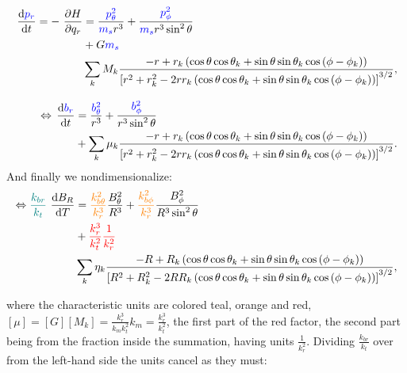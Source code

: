 \begin{align}
    \begin{split}
        \operatorname{}\frac{\mathrm{d} \textcolor{blue}{p_r}}{\mathrm{d} t} = -\operatorname{}\frac{\partial H}{\partial q_r} &= \frac{\textcolor{blue}{p_\theta^2}}{\textcolor{blue}{m_s} r^3} + \frac{\textcolor{blue}{p_\phi^2}}{\textcolor{blue}{m_s} r^3 \sin^2{\theta} } \\
        &+ G \textcolor{blue}{m_s} \\
        &\sum\limits_{k} M_k \frac{-r + r_k \left(\cos{\theta}\cos{\theta_k} + \sin{\theta}\sin{\theta_k}\cos{(\phi - \phi_k)}\right)}{\left[r^2 + r_k^2 - 2 r r_k \left(\cos{\theta}\cos{\theta_k} + \sin{\theta}\sin{\theta_k}\cos{(\phi - \phi_k)} \right) \right]^{3/2}},
    \end{split} \\[0.3cm]
    \begin{split}
        \Leftrightarrow \operatorname{}\frac{\mathrm{d} \textcolor{blue}{b_r}}{\mathrm{d} t} &= \frac{\textcolor{blue}{b_\theta^2}}{r^3} + \frac{\textcolor{blue}{b_\phi^2}}{r^3 \sin^2{\theta} } \\
        &+ \sum\limits_{k} \mu_k \frac{-r + r_k \left(\cos{\theta}\cos{\theta_k} + \sin{\theta}\sin{\theta_k}\cos{(\phi - \phi_k)}\right)}{\left[r^2 + r_k^2 - 2 r r_k \left(\cos{\theta}\cos{\theta_k} + \sin{\theta}\sin{\theta_k}\cos{(\phi - \phi_k)} \right) \right]^{3/2}}.
    \end{split}
\end{align}
And finally we nondimensionalize:
\begin{align}
    \begin{split}
        \Leftrightarrow \textcolor{teal}{\frac{k_{br}}{k_t}} \operatorname{}\frac{\mathrm{d} B_R}{\mathrm{d} T} &= \textcolor{orange}{\frac{k_{b\theta}^2}{k_r^3}} \frac{B_\theta^2}{R^3} + \textcolor{orange}{\frac{k_{b\phi}^2}{k_r^3}} \frac{B_\phi^2}{R^3 \sin^2{\theta} } \\
        &+ \textcolor{red}{\frac{k_r^3}{k_t^2}\frac{1}{k_r^2}} \\
        & \sum\limits_{k} \eta_k \frac{-R + R_k \left(\cos{\theta}\cos{\theta_k} + \sin{\theta}\sin{\theta_k}\cos{(\phi - \phi_k)}\right)}{\left[R^2 + R_k^2 - 2 R R_k \left(\cos{\theta}\cos{\theta_k} + \sin{\theta}\sin{\theta_k}\cos{(\phi - \phi_k)} \right) \right]^{3/2}},
    \end{split}
\end{align}

where the characteristic units are colored teal, orange and red, \([\mu] = [G] [M_k] = \frac{k_r^3}{k_m k_t^2} k_m = \frac{k_r^3}{k_t^2} \), the first part of the red factor, the second part being from the fraction inside the summation, having units \(\frac{1}{k_r^2}\). Dividing \(\frac{k_{br}}{k_t}\) over from the left-hand side the units cancel as they must:

